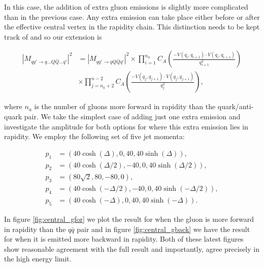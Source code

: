 In this case, the addition of extra gluon emissions is slightly more complicated than in the previous case. Any extra emission can take place either before or after the effective central vertex in the rapidity chain. This distinction needs to be kept track of and so our extension is 

\begin{equation}
\begin{split}
|M_{qq' \to q...Q\bar{Q}...q'}|^2 &= |M_{qq' \to qQ\bar{Q}q'}|^2 \times \prod_{i=1}^{n_a} C_A \left(\frac{-V(q_i,q_{i+1}) \cdot V(q_i,q_{i+1})}{q_{i+1}^2} \right) \\
&\times \prod_{j=n_a+2}^{n-2} C_A \left(\frac{-V(q_j,q_{j+1}) \cdot V(q_j,q_{j+1})}{q_j^2} \right),
\end{split}
\end{equation}

where $n_a$ is the number of gluons more forward in rapidity than the quark/anti-quark pair. We take the simplest case of adding just one extra emission and investigate the amplitude for both options for where this extra emission lies in rapidity. We employ the following set of five jet momenta:

\begin{equation}
\begin{split}
p_1 & = (40 \cosh(\Delta), 0, 40, 40 \sinh(\Delta)), \\
p_2 & = (40 \cosh(\Delta/2), -40, 0, 40 \sinh(\Delta/2)), \\
p_3 & = (80 \sqrt{2}, 80, -80, 0), \\
p_4 & = (40 \cosh(-\Delta/2), -40, 0, 40 \sinh(-\Delta/2)), \\
p_5 & = (40 \cosh(-\Delta), 0, 40, 40 \sinh(-\Delta)). 
\end{split}
\end{equation}

In figure \ref{fig:central_gfor} we plot the result for when the gluon is more forward in rapidity than the $q\bar{q}$ pair and in figure \ref{fig:central_gback} we have the result for when it is emitted more backward in rapidity. Both of these latest figures show reasonable agreement with the full result and importantly, agree precisely in the high energy limit. 

